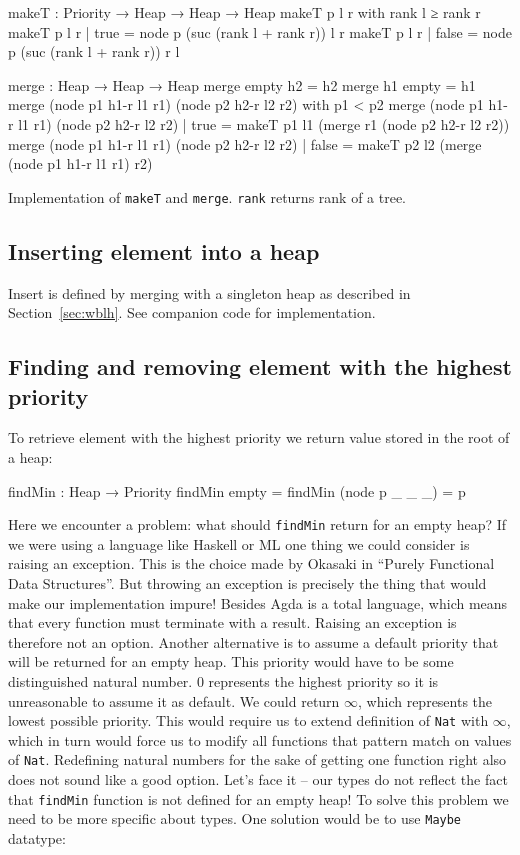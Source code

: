 \begin{listing}[htb!]
\begin{code}
makeT : Priority → Heap → Heap → Heap
makeT p l r with rank l ≥ rank r
makeT p l r | true  = node p (suc (rank l + rank r)) l r
makeT p l r | false = node p (suc (rank l + rank r)) r l

merge : Heap → Heap → Heap
merge empty h2 = h2
merge h1 empty = h1
merge (node p1 h1-r l1 r1) (node p2 h2-r l2 r2)
  with p1 < p2
merge (node p1 h1-r l1 r1) (node p2 h2-r l2 r2)
  | true  = makeT p1 l1 (merge r1 (node p2 h2-r l2 r2))
merge (node p1 h1-r l1 r1) (node p2 h2-r l2 r2)
  | false = makeT p2 l2 (merge (node p1 h1-r l1 r1) r2)
\end{code}
\caption{Implementation of \texttt{makeT} and \texttt{merge}. \texttt{rank} returns rank of a tree.}\label{lst:makeT-merge}
\end{listing}

\subsection{Inserting element into a heap}

Insert is defined by merging with a singleton heap as described in Section~\ref{sec:wblh}. See companion code for implementation.

\subsection{Finding and removing element with the highest priority}

To retrieve element with the highest priority we return value stored in the root of a heap:

\begin{code}
findMin : Heap → Priority
findMin empty          = 
findMin (node p _ _ _) = p
\end{code}
\noindent
Here we encounter a problem: what should \texttt{findMin} return for an empty heap? If we were using a language like Haskell or ML one thing we could consider is raising an exception. This is the choice made by Okasaki in ``Purely Functional Data Structures''. But throwing an exception is precisely the thing that would make our implementation impure! Besides Agda is a total language, which means that every function must terminate with a result. Raising an exception is therefore not an option. Another alternative is to assume a default priority that will be returned for an empty heap. This priority would have to be some distinguished natural number. $0$ represents the highest priority so it is unreasonable to assume it as default. We could return $\infty$, which represents the lowest possible priority. This would require us to extend definition of \texttt{Nat} with $\infty$, which in turn would force us to modify all functions that pattern match on values of \texttt{Nat}. Redefining natural numbers for the sake of getting one function right also does not sound like a good option. Let's face it -- our types do not reflect the fact that \texttt{findMin} function is not defined for an empty heap! To solve this problem we need to be more specific about types. One solution would be to use \texttt{Maybe} datatype:

